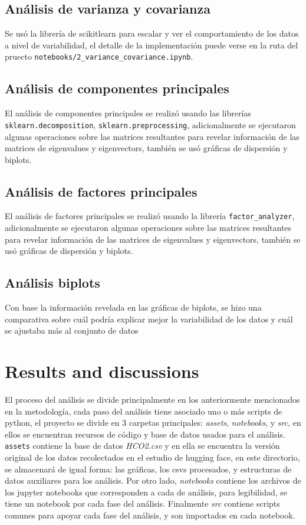 \documentclass[journal]{IEEEtran}
\begin{document}
	\subsection{Análisis de varianza y covarianza}
	\label{ssec:pca}
	Se usó la librería de scikitlearn para escalar y ver el comportamiento de los datos a nivel de variabilidad, el detalle de la implementación puede verse en la ruta del pruecto \texttt{notebooks/2\_variance\_covariance.ipynb}.

	\subsection{Análisis de componentes principales}
	\label{ssec:pca}
	El análisis de componentes principales se realizó usando las librerías \texttt{sklearn.decomposition}, \texttt{sklearn.preprocessing}, adicionalmente se ejecutaron algunas operaciones sobre las matrices resultantes para revelar información de las matrices de eigenvalues y eigenvectors, también se usó gráficas de dispersión y biplots.

	\subsection{Análisis de factores principales}
	El análisis de factores principales se realizó usando la librería \texttt{factor\_analyzer}, adicionalmente se ejecutaron algunas operaciones sobre las matrices resultantes para revelar información de las matrices de eigenvalues y eigenvectors, también se usó gráficas de dispersión y biplots.


	\subsection{Análisis biplots}
	Con base la información revelada en las gráficas de biplots, se hizo una comparativa sobre cuál podría explicar mejor la variabilidad de los datos y cuál se ajustaba más al conjunto de datos

	\section{Results and discussions}

	\label{sec:results}
	El proceso del análisis se divide principalmente en los anteriormente mencionados en la metodología, cada paso del análisis tiene asociado uno o más scripts de python, el proyecto se divide en 3 carpetas principales: \textit{assets}, \textit{notebooks},  y \textit{src}, en ellos se encuentran recursos de código y base de datos usados para el análisis. \texttt{assets} contiene la base de datos \textit{HCO2.csv} y en ella se encuentra la versión original de los datos recolectados en el estudio de hugging face\cite{exploring_carbon_footprint}, en este directorio, se almacenará de igual forma: las gráficas, los csvs procesados, y estructuras de datos auxiliares para los análisis. Por otro lado, \textit{notebooks} contiene los archivos de los jupyter notebooks que corresponden a cada de análisis, para legibilidad, se tiene un notebook por cada fase del análisis. Finalmente  \textit{src} contiene scripts comunes para apoyar cada fase del análisis, y son importados en cada notebook.
\end{document}
